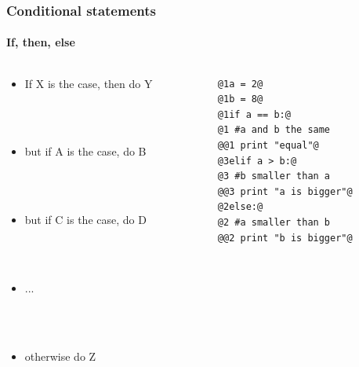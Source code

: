 \documentclass[handout]{beamer}
\begin{document}
\begin{frame}[fragile]
\frametitle{Conditional statements}
\framesubtitle{If, then, else}
\large
  \begin{columns}[T]
    \begin{column}{.5\textwidth} 


\begin{itemize}


\item<1-> {If X is the case, then do Y}

\ \\

\ \\

\item<3-> but if A is the case, do B

\ \\
\ \\


\item<3-> but if C is the case, do D

\ \\
\ \\


\item<3-> ...

\ \\

\ \\

\item<2-> otherwise do Z




\end{itemize}
     \end{column}     
         \begin{column}{.5\textwidth} 
\begin{lstlisting}[style=base]
@1a = 2@
@1b = 8@
@1if a == b:@
@1 #a and b the same
@@1 print "equal"@
@3elif a > b:@
@3 #b smaller than a
@@3 print "a is bigger"@
@2else:@
@2 #a smaller than b
@@2 print "b is bigger"@
\end{lstlisting}

    \end{column}
    \end{columns}

\end{frame}
\end{document}
